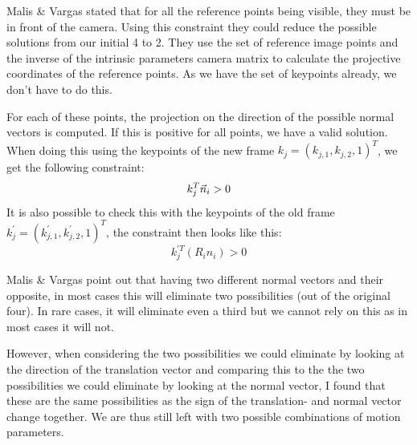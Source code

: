 Malis \& Vargas \cite{homography-decomposition} stated that for all the reference points being visible, they must be in front of the camera. Using this constraint they could reduce the possible solutions from our initial 4 to 2. They use the set of reference image points and the inverse of the intrinsic parameters camera matrix to calculate the projective coordinates of the reference points. As we have the set of keypoints already, we don't have to do this.\bigskip

For each of these points, the projection on the direction of the possible normal vectors is computed. If this is positive for all points, we have a valid solution. When doing this using the keypoints of the new frame $k_j = (k_{j, 1}, k_{j, 2}, 1)^T$, we get the following constraint:
\begin{equation}
    k_j^T\vec n_i > 0
\end{equation}
It is also possible to check this with the keypoints of the old frame $k^{'}_j = (k^{'}_{j, 1}, k^{'}_{j, 2}, 1)^T$, the constraint then looks like this:
\begin{equation}
    k^{'T}_j (R_{i}n_i) > 0
\end{equation}

Malis \& Vargas point out that having two different normal vectors and their opposite, in most cases this will  eliminate two possibilities (out of the original four). In rare cases, it will eliminate even a third but we cannot rely on this as in most cases it will not.\bigksip

However, when considering the two possibilities we could eliminate by looking at the direction of the translation vector and comparing this to the the two possibilities we could eliminate by looking at the normal vector, I found that these are the same possibilities as the sign of the translation- and normal vector change together. We are thus still left with two possible combinations of motion parameters. 